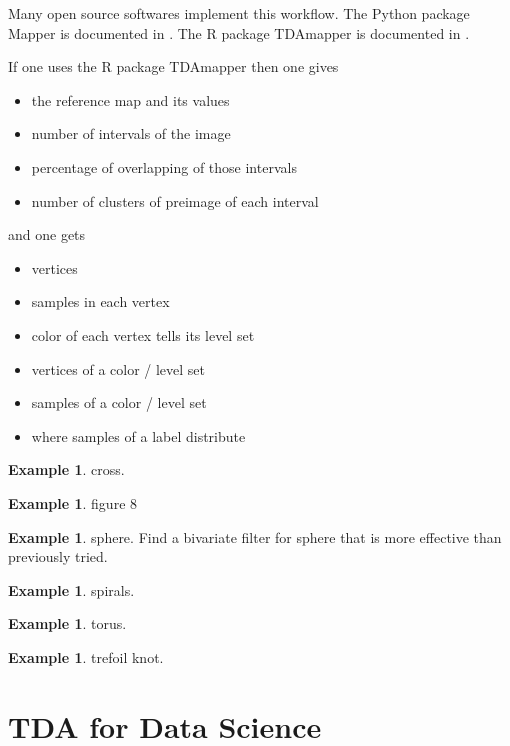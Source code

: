 \documentclass[12pt]{amsart}
\theoremstyle{definition}
\newtheorem{example}[theorem]{Example}
\begin{document}
Many open source softwares implement this workflow. The Python package Mapper is documented in \cite{PythonMapper}. The R package TDAmapper is documented in \cite{TDAmapper}.

If one uses the R package TDAmapper then one gives
\begin{itemize}
\item the reference map and its values
\item number of intervals of the image
\item percentage of overlapping of those intervals
\item number of clusters of preimage of each interval
\end{itemize}
and one gets
\begin{itemize}
\item vertices
\item samples in each vertex
\item color of each vertex tells its level set
\item vertices of a color / level set
\item samples of a color / level set
\item where samples of a label distribute
\end{itemize}

\begin{example} cross.
\end{example}

\begin{example} figure 8
\end{example}

\begin{example} sphere. Find a bivariate filter for sphere that is more effective than previously tried.
\end{example}

\begin{example} spirals.
\end{example}

\begin{example} torus.
\end{example}

\begin{example} trefoil knot.
\end{example}


\section{TDA for Data Science}
\end{document}
